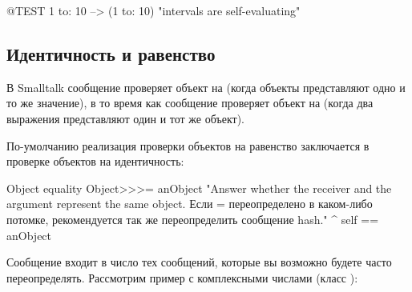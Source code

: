 \documentclass[a4paper,10pt,twoside]{book}
\begin{document}
\begin{code}{@TEST}
1 to: 10 --> (1 to: 10)    "intervals are self-evaluating"
\end{code}

\subsection{Идентичность и равенство}

В Smalltalk сообщение \ct{=} проверяет объект на  (\ie когда объекты представляют одно и то же значение), в то время как сообщение \ct{==} проверяет объект на  (\ie когда два выражения представляют один и тот же объект).

По-умолчанию реализация проверки объектов на равенство заключается в проверке объектов на идентичность:
\begin{method}{Object equality}
Object>>>= anObject
    "Answer whether the receiver and the argument represent the same object.
    Если = переопределено в каком-либо потомке, рекомендуется так же
    переопределить сообщение hash."
    ^ self == anObject
\end{method}


Сообщение \ct{=} входит в число тех сообщений, которые вы возможно будете часто переопределять. Рассмотрим пример с комплексными числами (класс ):
\end{document}
